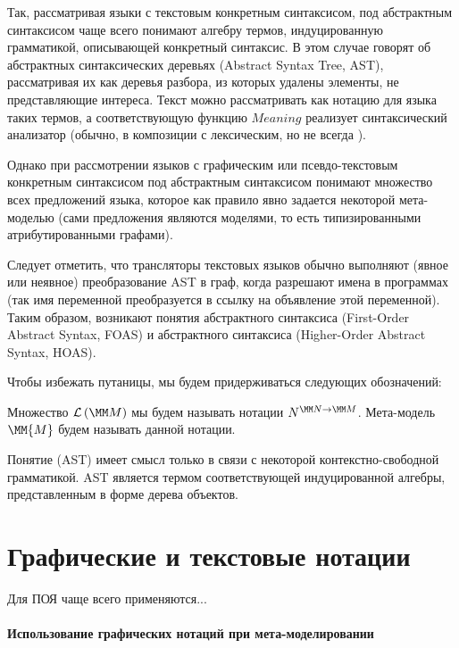 {Так, рассматривая языки с текстовым конкретным синтаксисом, под абстрактным синтаксисом чаще всего понимают алгебру термов, индуцированную грамматикой, описывающей конкретный синтаксис. В этом случае говорят об абстрактных синтаксических деревьях (Abstract Syntax Tree, AST), рассматривая их как деревья разбора, из которых удалены элементы, не представляющие интереса. Текст можно рассматривать как нотацию для языка таких термов, а соответствующую функцию $Meaning$ реализует синтаксический анализатор (обычно, в композиции с лексическим, но не всегда \cite{SGLR}).

Однако при рассмотрении языков с графическим или псевдо-текстовым конкретным синтаксисом  \cite{MPS, ...} под абстрактным синтаксисом понимают множество всех предложений языка, которое как правило явно задается некоторой мета-моделью (сами предложения являются моделями, то есть типизированными атрибутированными графами).

Следует отметить, что трансляторы текстовых языков обычно выполняют (явное или неявное) преобразование AST в граф, когда разрешают имена в программах (так имя переменной преобразуется в ссылку на объявление этой переменной). Таким образом, возникают понятия  абстрактного синтаксиса (First-Order Abstract Syntax, FOAS) и абстрактного синтаксиса  (Higher-Order Abstract Syntax, HOAS). 

Чтобы избежать путаницы, мы будем придерживаться следующих обозначений:

\begin{Def}
Множество $\LMM{M}$ мы будем называть  нотации $\N{N}{M}$. Мета-модель $\MM{M}$ будем называть  данной нотации.
\end{Def}

\begin{Def}
Понятие  (AST) имеет смысл только в связи с некоторой контекстно-свободной грамматикой. AST является термом соответствующей индуцированной алгебры, представленным в форме дерева объектов.
\end{Def}

\section{Графические и текстовые нотации}

Для ПОЯ чаще всего применяются...

\paragraph*{Использование графических нотаций при мета-моделировании}

}
